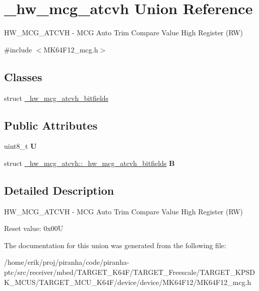 \hypertarget{union__hw__mcg__atcvh}{}\section{\+\_\+hw\+\_\+mcg\+\_\+atcvh Union Reference}
\label{union__hw__mcg__atcvh}


H\+W\+\_\+\+M\+C\+G\+\_\+\+A\+T\+C\+VH -\/ M\+CG Auto Trim Compare Value High Register (RW)  




{\ttfamily \#include $<$M\+K64\+F12\+\_\+mcg.\+h$>$}

\subsection*{Classes}
\begin{DoxyCompactItemize}
\item 
struct \hyperlink{struct__hw__mcg__atcvh_1_1__hw__mcg__atcvh__bitfields}{\+\_\+hw\+\_\+mcg\+\_\+atcvh\+\_\+bitfields}
\end{DoxyCompactItemize}
\subsection*{Public Attributes}
\begin{DoxyCompactItemize}
\item 
uint8\+\_\+t {\bfseries U}\hypertarget{union__hw__mcg__atcvh_a1a5b32a4c5c1906a4459bc5ae89b5dc7}{}\label{union__hw__mcg__atcvh_a1a5b32a4c5c1906a4459bc5ae89b5dc7}

\item 
struct \hyperlink{struct__hw__mcg__atcvh_1_1__hw__mcg__atcvh__bitfields}{\+\_\+hw\+\_\+mcg\+\_\+atcvh\+::\+\_\+hw\+\_\+mcg\+\_\+atcvh\+\_\+bitfields} {\bfseries B}\hypertarget{union__hw__mcg__atcvh_ad65f6dd3453955f963f040d29d242210}{}\label{union__hw__mcg__atcvh_ad65f6dd3453955f963f040d29d242210}

\end{DoxyCompactItemize}


\subsection{Detailed Description}
H\+W\+\_\+\+M\+C\+G\+\_\+\+A\+T\+C\+VH -\/ M\+CG Auto Trim Compare Value High Register (RW) 

Reset value\+: 0x00U 

The documentation for this union was generated from the following file\+:\begin{DoxyCompactItemize}
\item 
/home/erik/proj/piranha/code/piranha-\/ptc/src/receiver/mbed/\+T\+A\+R\+G\+E\+T\+\_\+\+K64\+F/\+T\+A\+R\+G\+E\+T\+\_\+\+Freescale/\+T\+A\+R\+G\+E\+T\+\_\+\+K\+P\+S\+D\+K\+\_\+\+M\+C\+U\+S/\+T\+A\+R\+G\+E\+T\+\_\+\+M\+C\+U\+\_\+\+K64\+F/device/device/\+M\+K64\+F12/M\+K64\+F12\+\_\+mcg.\+h\end{DoxyCompactItemize}
